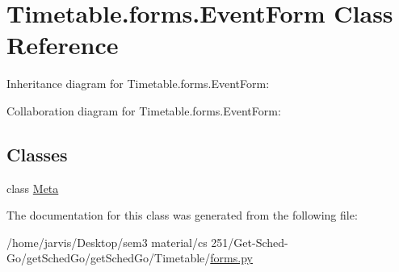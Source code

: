 \hypertarget{classTimetable_1_1forms_1_1EventForm}{}\section{Timetable.\+forms.\+Event\+Form Class Reference}
\label{classTimetable_1_1forms_1_1EventForm}


Inheritance diagram for Timetable.\+forms.\+Event\+Form\+:


Collaboration diagram for Timetable.\+forms.\+Event\+Form\+:
\subsection*{Classes}
\begin{DoxyCompactItemize}
\item 
class \hyperlink{classTimetable_1_1forms_1_1EventForm_1_1Meta}{Meta}
\end{DoxyCompactItemize}


The documentation for this class was generated from the following file\+:\begin{DoxyCompactItemize}
\item 
/home/jarvis/\+Desktop/sem3 material/cs 251/\+Get-\/\+Sched-\/\+Go/get\+Sched\+Go/get\+Sched\+Go/\+Timetable/\hyperlink{Timetable_2forms_8py}{forms.\+py}\end{DoxyCompactItemize}
